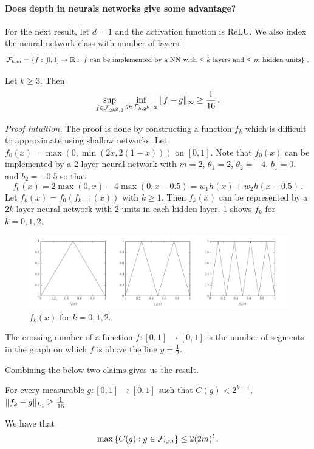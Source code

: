\documentclass[twoside]{article}
\newcommand{\set}[1]{\left\{#1\right\}}
\begin{document}
\paragraph{Does depth in neurals networks give some advantage?}
For the next result, let $d=1$ and the activation function is ReLU. We also index the neural network class with number of layers:
\[
    \cF_{k, m} = \set{ f:[0,1]\to\R : \text{ $f$ can be implemented by a NN with $\le k$ layers and $\le m$ hidden units}} \,. 
\]

\begin{theorem}[Telgarsky, 2016]\label{thm:deep-shallow-nn}
    Let $k \ge 3$. Then 
    \[
        \sup_{f \in \mathcal{F}_{2k^2, 2}} \inf_{g \in \mathcal{F}_{k, 2^{k-2}}} \|f-g\|_\infty \ge \frac{1}{16}\,.
    \]
\end{theorem}
\emph{Proof intuition. }
The proof is done by constructing a function $f_k$ which is difficult to approximate using shallow networks. Let $f_0(x) = \max(0, \min(2x, 2(1-x)))$ on $[0,1]$. Note that $f_0(x)$ can be implemented by a 2 layer neural network with $m=2$, $\theta_1 = 2$, $\theta_2 = -4$, $b_1 = 0$, and $b_2 = -0.5$ so that 
\[
    f_0(x) = 2 \max(0,x) - 4\max(0, x-0.5) = w_1 h(x) + w_2 h(x-0.5) \,.
\]
Let $f_k(x) = f_0(f_{k-1}(x))$ with $k \ge 1$. Then $f_k(x)$ can be represented by a $2k$ layer neural network with 2 units in each hidden layer. \cref{fig:f0} shows $f_k$ for $k=0,1,2$. 

\begin{figure}[h]
    \centering

 \includegraphics[width=\linewidth]{figures/nn-telgarsky.png}
    \caption{$f_k(x)$ for $k=0, 1, 2$.}
    \label{fig:f0}
\end{figure}

\begin{definition}
    The crossing number of a function $f:[0,1] \to [0,1]$ is the number of segments in the graph on which $f$ is above the line $y=\frac12$.
\end{definition}
Combining the below two claims gives us the result. 
\begin{claim}
    For every measurable $g:[0,1] \to [0,1]$ such that $C(g) < 2^{k-1}$, $\|f_k - g\|_{L_1} \ge \frac{1}{16}$.
\end{claim}

\begin{claim}
We have that
\[
        \max\set{ C(g) : g \in \cF_{l,m} } \le 2(2m)^l \,.
\]
\end{claim}
 
\end{document}
